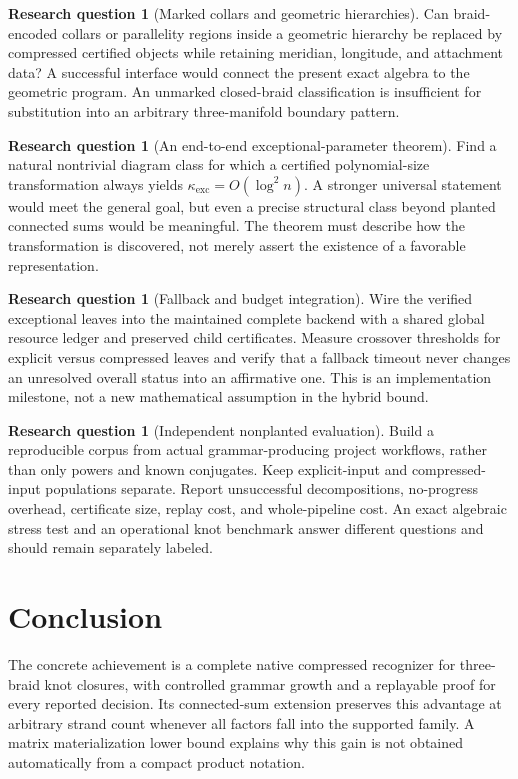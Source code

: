 \documentclass[11pt,letterpaper]{article}
\theoremstyle{definition}\newtheorem{definition}[theorem]{Definition}
\newtheorem{question}[theorem]{Research question}
\theoremstyle{remark}\newtheorem{remark}[theorem]{Remark}
\newcommand{\exc}{\mathrm{exc}}
\begin{document}
\begin{question}[Marked collars and geometric hierarchies]
Can braid-encoded collars or parallelity regions inside a geometric hierarchy be replaced by compressed certified objects while retaining meridian, longitude, and attachment data? A successful interface would connect the present exact algebra to the geometric program. An unmarked closed-braid classification is insufficient for substitution into an arbitrary three-manifold boundary pattern.
\end{question}

\begin{question}[An end-to-end exceptional-parameter theorem]
Find a natural nontrivial diagram class for which a certified polynomial-size transformation always yields $\kappa_{\exc}=O(\log^2 n)$. A stronger universal statement would meet the general goal, but even a precise structural class beyond planted connected sums would be meaningful. The theorem must describe how the transformation is discovered, not merely assert the existence of a favorable representation.
\end{question}

\begin{question}[Fallback and budget integration]
Wire the verified exceptional leaves into the maintained complete backend with a shared global resource ledger and preserved child certificates. Measure crossover thresholds for explicit versus compressed leaves and verify that a fallback timeout never changes an unresolved overall status into an affirmative one. This is an implementation milestone, not a new mathematical assumption in the hybrid bound.
\end{question}

\begin{question}[Independent nonplanted evaluation]
Build a reproducible corpus from actual grammar-producing project workflows, rather than only powers and known conjugates. Keep explicit-input and compressed-input populations separate. Report unsuccessful decompositions, no-progress overhead, certificate size, replay cost, and whole-pipeline cost. An exact algebraic stress test and an operational knot benchmark answer different questions and should remain separately labeled.
\end{question}

\section{Conclusion}
The concrete achievement is a complete native compressed recognizer for three-braid knot closures, with controlled grammar growth and a replayable proof for every reported decision. Its connected-sum extension preserves this advantage at arbitrary strand count whenever all factors fall into the supported family. A matrix materialization lower bound explains why this gain is not obtained automatically from a compact product notation.
\end{document}
